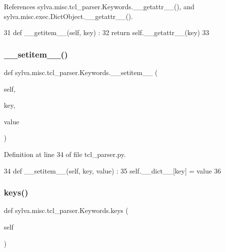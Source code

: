 References sylva.\+misc.\+tcl\+\_\+parser.\+Keywords.\+\_\+\+\_\+getattr\+\_\+\+\_\+(), and sylva.\+misc.\+exec.\+Dict\+Object.\+\_\+\+\_\+getattr\+\_\+\+\_\+().


\begin{DoxyCode}
31     \textcolor{keyword}{def }\_\_getitem\_\_(self, key) :
32       \textcolor{keywordflow}{return} self.\_\_getattr\_\_(key)
33 
\end{DoxyCode}
\mbox{\label{classsylva_1_1misc_1_1tcl__parser_1_1_keywords_a3472d59fe7173f29ba51f1153a8d9710}} 
\subsubsection{\texorpdfstring{\+\_\+\+\_\+setitem\+\_\+\+\_\+()}{\_\_setitem\_\_()}}
{\footnotesize\ttfamily def sylva.\+misc.\+tcl\+\_\+parser.\+Keywords.\+\_\+\+\_\+setitem\+\_\+\+\_\+ (\begin{DoxyParamCaption}\item[{}]{self,  }\item[{}]{key,  }\item[{}]{value }\end{DoxyParamCaption})}



Definition at line 34 of file tcl\+\_\+parser.\+py.


\begin{DoxyCode}
34     \textcolor{keyword}{def }\_\_setitem\_\_(self, key, value) :
35       self.\_\_dict\_\_[key] = value
36 
\end{DoxyCode}
\mbox{\label{classsylva_1_1misc_1_1tcl__parser_1_1_keywords_aab14f0aa36691de260b7c63be5ad6ee9}} 
\subsubsection{\texorpdfstring{keys()}{keys()}}
{\footnotesize\ttfamily def sylva.\+misc.\+tcl\+\_\+parser.\+Keywords.\+keys (\begin{DoxyParamCaption}\item[{}]{self }\end{DoxyParamCaption})}




